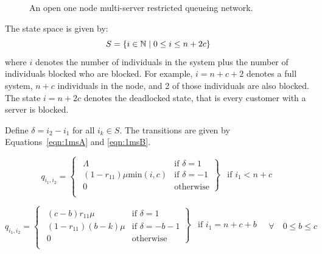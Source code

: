 \documentclass{article}
\numberwithin{equation}{section}
\begin{document}
\begin{figure}[!htbp]
  \begin{center}
  
  \end{center}
  \caption{An open one node multi-server restricted queueing network.}
  \label{fig:queueingnetwork_1nodemulti}
\end{figure}

The state space is given by:
        \[S = \{i\in\mathbb{N} \nonscript\; | \nonscript\; 0 \leq i \leq n + 2c\}\]
where \(i\) denotes the number of individuals in the system plus the number of
individuals blocked who are blocked.
For example, $i=n+c+2$ denotes a full system, $n+c$ individuals in the node,
and 2 of those individuals are also blocked.
The state $i=n+2c$ denotes the deadlocked state, that is every customer with a
server is blocked.

Define $\delta = i_2 - i_1$ for all $i_k \in S$.
The transitions are given by Equations~\ref{eqn:1msA} and \ref{eqn:1msB}.

\begin{equation}\label{eqn:1msA}
  q_{i_1, i_2} = \left\{
  \begin{array}{rr}
    \left. \begin{array}{rr}
      \Lambda & \text{if } \delta = 1 \\
      (1-r_{11})\mu\text{min}(i, c) & \text{if } \delta = -1 \\
      0 & \text{otherwise}
    \end{array} \right\} & \text{if } i_1 < n + c \\
  \end{array} \right.
\end{equation}

\begin{equation}\label{eqn:1msB}
  q_{i_1, i_2} = \left\{
  \begin{array}{rr}
    \left. \begin{array}{rr}
      (c-b)r_{11}\mu & \text{if } \delta = 1 \\
      (1-r_{11})(b-k)\mu & \text{if } \delta = -b-1\\
      0 & \text{otherwise}
    \end{array} \right\} & \text{if } i_1 = n + c + b \\
  \end{array} \right.
  \quad \forall \quad 0 \leq b \leq c
\end{equation}
\end{document}
